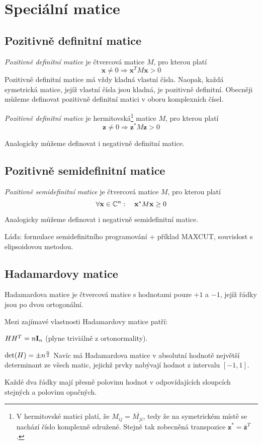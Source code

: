 \section{Speciální matice}

\subsection{Pozitivně definitní matice}

\df \emph{Pozitivně definitní matice} je čtvercová matice $M$, pro kterou platí
$$\mathbf{x} \neq 0 \Rightarrow \mathbf{x}^TM\mathbf{x} > 0$$
Pozitivně definitní matice má vždy kladná vlastní čísla. Naopak, každá
symetrická matice, jejíž vlastní čísla jsou kladná, je pozitivně definitní.
Obecněji můžeme definovat pozitivně definitní matici v oboru komplexních čísel.

\df \emph{Pozitivně definitní matice} je hermitovská\footnote{V hermitovské
matici platí, že $M_{ij} = \overline{M_{ji}}$, tedy že na symetrickém místě se
nachází číslo komplexně sdružené. Stejně tak zobecněná transpozice $\mathbf{z}^*
= \mathbf{\bar z}^T$.} matice $M$, pro kterou platí
$$\mathbf{z} \neq 0 \Rightarrow \mathbf{z}^*M\mathbf{z} > 0$$

Analogicky můžeme definovat i negativně definitní matice.

\subsection{Pozitivně semidefinitní matice}
\df \emph{Pozitivně semidefinitní matice} je čtvercová matice $M$, pro kterou platí
$$\forall \mathbf{x} \in \mathbb{C}^n:\quad \mathbf{x}^*M\mathbf{x} \ge 0$$

Analogicky můžeme definovat i negativně semidefinitní matice.

\todo Láďa: formulace semidefinitního programování + příklad MAXCUT, souvislost
s elipsoidovou metodou.

\subsection{Hadamardovy matice}

\df Hadamardova matice je čtvercová matice s hodnotami pouze $+1$ a $-1$, jejíž
řádky jsou po dvou ortogonální.

Mezi zajímavé vlastnosti Hadamardovy matice patří:

\begin{itemize*}
\item $HH^T = n{\bf I}_n$ (plyne triviálně z ortonormality).
\item $\det(H) = \pm n^{n\over 2}$ Navíc má Hadamardova matice v absolutní
hodnotě největší determinant ze všech matic, jejichž prvky nabývají hodnot z
intervalu $[-1, 1]$.
\item Každé dva řádky mají přesně polovinu hodnot v odpovídajících sloupcích stejných a polovinu opačných.
\end{itemize*}

